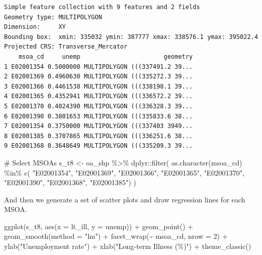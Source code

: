 \documentclass[
  letterpaper,
  DIV=11,
  numbers=noendperiod,
  oneside]{scrreprt}
\newenvironment{Shaded}{\begin{snugshade}}{\end{snugshade}}
\newcommand{\AttributeTok}[1]{\textcolor[rgb]{0.40,0.45,0.13}{#1}}
\newcommand{\CommentTok}[1]{\textcolor[rgb]{0.37,0.37,0.37}{#1}}
\newcommand{\DecValTok}[1]{\textcolor[rgb]{0.68,0.00,0.00}{#1}}
\newcommand{\FunctionTok}[1]{\textcolor[rgb]{0.28,0.35,0.67}{#1}}
\newcommand{\NormalTok}[1]{\textcolor[rgb]{0.00,0.23,0.31}{#1}}
\newcommand{\OtherTok}[1]{\textcolor[rgb]{0.00,0.23,0.31}{#1}}
\newcommand{\SpecialCharTok}[1]{\textcolor[rgb]{0.37,0.37,0.37}{#1}}
\newcommand{\StringTok}[1]{\textcolor[rgb]{0.13,0.47,0.30}{#1}}
\begin{document}
\begin{verbatim}
Simple feature collection with 9 features and 2 fields
Geometry type: MULTIPOLYGON
Dimension:     XY
Bounding box:  xmin: 335032 ymin: 387777 xmax: 338576.1 ymax: 395022.4
Projected CRS: Transverse_Mercator
    msoa_cd     unemp                       geometry
1 E02001354 0.5000000 MULTIPOLYGON (((337491.2 39...
2 E02001369 0.4960630 MULTIPOLYGON (((335272.3 39...
3 E02001366 0.4461538 MULTIPOLYGON (((338198.1 39...
4 E02001365 0.4352941 MULTIPOLYGON (((336572.2 39...
5 E02001370 0.4024390 MULTIPOLYGON (((336328.3 39...
6 E02001390 0.3801653 MULTIPOLYGON (((335833.6 38...
7 E02001354 0.3750000 MULTIPOLYGON (((337403 3949...
8 E02001385 0.3707865 MULTIPOLYGON (((336251.6 38...
9 E02001368 0.3648649 MULTIPOLYGON (((335209.3 39...
\end{verbatim}

\begin{Shaded}
\begin{Highlighting}[]
\CommentTok{\# Select MSOAs}
\NormalTok{s\_t8 }\OtherTok{\textless{}{-}}\NormalTok{ oa\_shp }\SpecialCharTok{\%\textgreater{}\%}\NormalTok{ dplyr}\SpecialCharTok{::}\FunctionTok{filter}\NormalTok{(}
    \FunctionTok{as.character}\NormalTok{(msoa\_cd) }\SpecialCharTok{\%in\%} \FunctionTok{c}\NormalTok{(}
      \StringTok{"E02001354"}\NormalTok{, }
      \StringTok{"E02001369"}\NormalTok{, }
      \StringTok{"E02001366"}\NormalTok{, }
      \StringTok{"E02001365"}\NormalTok{, }
      \StringTok{"E02001370"}\NormalTok{, }
      \StringTok{"E02001390"}\NormalTok{, }
      \StringTok{"E02001368"}\NormalTok{, }
      \StringTok{"E02001385"}\NormalTok{)}
\NormalTok{    )}
\end{Highlighting}
\end{Shaded}

And then we generate a set of scatter plots and draw regression lines
for each MSOA.

\begin{Shaded}
\begin{Highlighting}[]
\FunctionTok{ggplot}\NormalTok{(s\_t8, }\FunctionTok{aes}\NormalTok{(}\AttributeTok{x =}\NormalTok{ lt\_ill, }\AttributeTok{y =}\NormalTok{ unemp)) }\SpecialCharTok{+} 
  \FunctionTok{geom\_point}\NormalTok{() }\SpecialCharTok{+} 
  \FunctionTok{geom\_smooth}\NormalTok{(}\AttributeTok{method =} \StringTok{"lm"}\NormalTok{) }\SpecialCharTok{+}
  \FunctionTok{facet\_wrap}\NormalTok{(}\SpecialCharTok{\textasciitilde{}}\NormalTok{ msoa\_cd, }\AttributeTok{nrow =} \DecValTok{2}\NormalTok{) }\SpecialCharTok{+}
  \FunctionTok{ylab}\NormalTok{(}\StringTok{"Unemployment rate"}\NormalTok{) }\SpecialCharTok{+} 
  \FunctionTok{xlab}\NormalTok{(}\StringTok{"Long{-}term Illness (\%)"}\NormalTok{) }\SpecialCharTok{+}
  \FunctionTok{theme\_classic}\NormalTok{()}
\end{Highlighting}
\end{Shaded}
\end{document}
